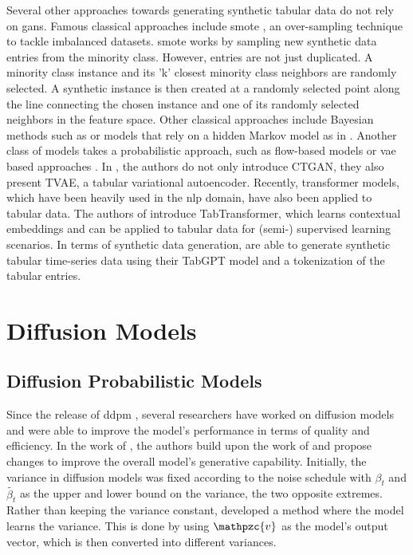 Several other approaches towards generating synthetic tabular data do not rely on \glspl{gan}.
Famous classical approaches include \gls{smote} \cite{chawla2002SMOTESyntheticMinority}, an over-sampling technique to tackle imbalanced datasets.
\gls{smote} works by sampling new synthetic data entries from the minority class.
However, entries are not just duplicated.
A minority class instance and its 'k' closest minority class neighbors are randomly selected. 
A synthetic instance is then created at a randomly selected point along the line connecting the chosen instance and one of its randomly selected neighbors in the feature space.
Other classical approaches include Bayesian methods such as \cite{zhang2017PrivBayesPrivateData} or models that rely on a hidden Markov model as in \cite{dahmen2019SynSysSyntheticData}.
Another class of models takes a probabilistic approach, such as flow-based models \cite{kamthe2021CopulaFlowsSynthetic} or \gls{vae} based approaches \cite{kingma2013AutoEncodingVariationalBayes}.
In \cite{xu2019ModelingTabularData}, the authors do not only introduce CTGAN, they also present TVAE, a tabular variational autoencoder.
Recently, transformer models, which have been heavily used in the \gls{nlp} domain, have also been applied to tabular data.
The authors of \cite{huang2020TabTransformerTabularData} introduce TabTransformer, which learns contextual embeddings and can be applied to tabular data for (semi-) supervised learning scenarios.
In terms of synthetic data generation, \textcite{padhi2021TabularTransformersModeling} are able to generate synthetic tabular time-series data using their TabGPT model and a tokenization of the tabular entries.



\section{Diffusion Models}
\label{ch:relatedWork-diffusionModels}

\subsection{Diffusion Probabilistic Models}
\label{ch:preliminaries-diffusionProbabilisticModelsTabularData}

Since the release of \gls{ddpm} \cite{ho2020DenoisingDiffusionProbabilistic}, several researchers have worked on diffusion models and were able to improve the model's performance in terms of quality and efficiency.
In the work of \textcite{nichol2021ImprovedDenoisingDiffusion}, the authors build upon the work of \textcite{ho2020DenoisingDiffusionProbabilistic} and propose changes to improve the overall model's generative capability.
Initially, the variance in diffusion models was fixed according to the noise schedule with $\beta_t$ and $\tilde{\beta_t}$ as the upper and lower bound on the variance, the two opposite extremes.
Rather than keeping the variance constant, \textcite{nichol2021ImprovedDenoisingDiffusion} developed a method where the model learns the variance. 
This is done by using $\mathpzc{v}$ as the model's output vector, which is then converted into different variances.

